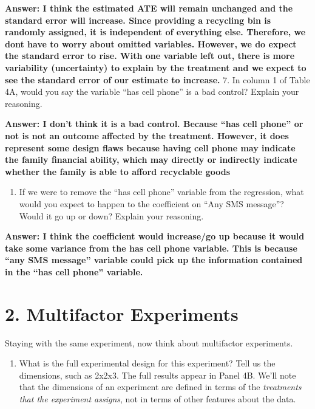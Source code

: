 \documentclass[
]{article}
\providecommand{\tightlist}{%
  \setlength{\itemsep}{0pt}\setlength{\parskip}{0pt}}
\begin{document}
\textbf{Answer: I think the estimated ATE will remain unchanged and the
standard error will increase. Since providing a recycling bin is
randomly assigned, it is independent of everything else. Therefore, we
dont have to worry about omitted variables. However, we do expect the
standard error to rise. With one variable left out, there is more
variability (uncertainty) to explain by the treatment and we expect to
see the standard error of our estimate to increase.} 7. In column 1 of
Table 4A, would you say the variable ``has cell phone'' is a bad
control? Explain your reasoning.

\textbf{Answer: I don't think it is a bad control. Because ``has cell
phone'' or not is not an outcome affected by the treatment. However, it
does represent some design flaws because having cell phone may indicate
the family financial ability, which may directly or indirectly indicate
whether the family is able to afford recyclable goods}

\begin{enumerate}
\def\labelenumi{\arabic{enumi}.}
\setcounter{enumi}{7}
\tightlist
\item
  If we were to remove the ``has cell phone'' variable from the
  regression, what would you expect to happen to the coefficient on
  ``Any SMS message''? Would it go up or down? Explain your reasoning.
\end{enumerate}

\textbf{Answer: I think the coefficient would increase/go up because it
would take some variance from the has cell phone variable. This is
because ``any SMS message'' variable could pick up the information
contained in the ``has cell phone'' variable.}

\hypertarget{multifactor-experiments}{%
\section{2. Multifactor Experiments}\label{multifactor-experiments}}

Staying with the same experiment, now think about multifactor
experiments.

\begin{enumerate}
\def\labelenumi{\arabic{enumi}.}
\tightlist
\item
  What is the full experimental design for this experiment? Tell us the
  dimensions, such as 2x2x3. The full results appear in Panel 4B. We'll
  note that the dimensions of an experiment are defined in terms of the
  \emph{treatments that the experiment assigns}, not in terms of other
  features about the data.
\end{enumerate}
\end{document}
